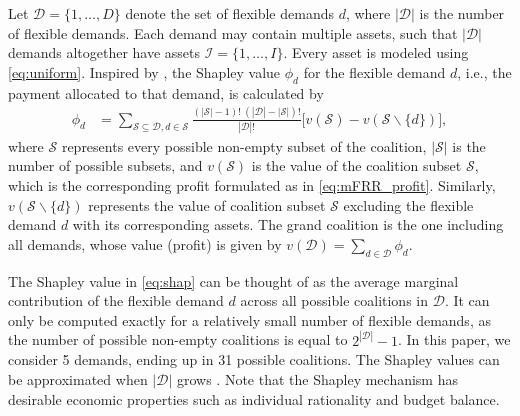 \documentclass[conference]{IEEEtran}
\begin{document}
Let $\mathcal{D}=\{1, \hdots, D \}$ denote the set of flexible demands $d$, where $|\mathcal{D}|$ is the number of flexible demands. Each demand may contain multiple assets, such that $|\mathcal{D}|$ demands altogether have assets $\mathcal{I}=\{1, \hdots, I \}$. Every asset is modeled using \eqref{eq:uniform}.
%
Inspired by \cite{shapley1997value}, the Shapley value $\phi_d$  for the flexible demand $d$, i.e., the payment allocated to that demand, is calculated by
%
\begin{align}\label{eq:shap}
    \phi_d & = \sum_{\mathcal{S} \subseteq \mathcal{D}, d \in \mathcal{S}} \frac{(|\mathcal{S}|-1)! \ (|\mathcal{D}|-|\mathcal{S}|)!}{|\mathcal{D}|!}\Big[v(\mathcal{S})-v(\mathcal{S} \backslash\{d\})\Big],
\end{align}
%
where $\mathcal{S}$ represents every possible non-empty subset of the coalition, $|\mathcal{S}|$ is the number of possible subsets,  and $v(\mathcal{S})$ is the value of the coalition subset $\mathcal{S}$, which is the corresponding profit formulated as in \eqref{eq:mFRR_profit}. Similarly, $v(\mathcal{S} \backslash\{d\})$ represents the value of coalition subset $\mathcal{S}$ excluding the flexible demand $d$ with its corresponding assets. The grand coalition is the one including all demands, whose value (profit) is given by $v(\mathcal{D}) = \sum_{d \in \mathcal{D}} \phi_{d}$.


The Shapley value  in \eqref{eq:shap} can be thought of as the average marginal contribution of the flexible demand $d$ across all possible coalitions in $\mathcal{D}$. It can only be computed exactly for a relatively small number of flexible demands, as the number of  possible non-empty coalitions is equal to $2^{|\mathcal{D}|} - 1$. In this paper, we consider 5 demands, ending up in 31 possible coalitions. The Shapley values can be approximated when $|\mathcal{D}|$ grows \cite{castro2009polynomial}.
Note that the Shapley mechanism has desirable economic properties such as individual rationality  and budget balance.

\end{document}
